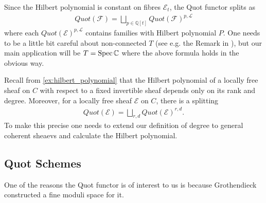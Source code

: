 \documentclass[12pt]{ociamthesis}  %
\begin{document}
Since the Hilbert polynomial is constant on fibres $\mathscr E_t$,
the Quot functor splits as
\begin{align*}
  Quot(\mathscr F)
  = \bigsqcup_{p\in\mathbb{Q}[t]} Quot(\mathscr F)^{p,\mathscr L}
\end{align*}
where each $Quot(\mathscr E)^{p,\mathscr L}$ contains families
with Hilbert polynomial $P$. One needs to be a little bit careful
about non-connected $T$ (see e.g. the Remark in \cite[5-6]{siddharth2016}), but our main application will be
$T = \operatorname{Spec}\mathbb C$ where the above formula holds in the obvious way.

\begin{example}
  Recall from \ref{ex:hilbert_polynomial} that the Hilbert polynomial of a
  locally free sheaf on $C$ with respect to a fixed invertible sheaf depends
  only on its rank and degree. Moreover, for a locally free sheaf
  $\mathscr E$ on $C$, there is a splitting
  \begin{align}\label{eq:quot_functor_split_on_c}
    Quot(\mathscr E) = \bigsqcup_{r,d} Quot(\mathscr E)^{r,d}.
  \end{align}
  To make this precise one needs to extend our definition of degree
  to general coherent sheaevs and calculate the Hilbert polynomial.
\end{example}

\subsection{Quot Schemes}

One of the reasons the Quot functor is of interest to us is because
Grothendieck constructed a fine moduli space for it. \cite[{Proposition 3.8}]{grothendieck1961}
\end{document}
